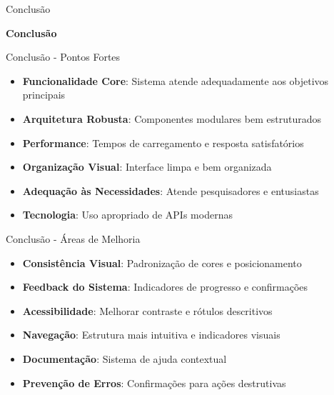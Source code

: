 \documentclass[landscape, 12pt]{beamer}
\begin{document}
\begin{frame}{Conclusão}
    \begin{center}
        \textbf{Conclusão}
    \end{center}
\end{frame}

\begin{frame}{Conclusão - Pontos Fortes}
    \begin{itemize}
        \item \textbf{Funcionalidade Core}: Sistema atende adequadamente aos objetivos principais
        \item \textbf{Arquitetura Robusta}: Componentes modulares bem estruturados
        \item \textbf{Performance}: Tempos de carregamento e resposta satisfatórios
        \item \textbf{Organização Visual}: Interface limpa e bem organizada
        \item \textbf{Adequação às Necessidades}: Atende pesquisadores e entusiastas
        \item \textbf{Tecnologia}: Uso apropriado de APIs modernas
    \end{itemize}
\end{frame}

\begin{frame}{Conclusão - Áreas de Melhoria}
    \begin{itemize}
        \item \textbf{Consistência Visual}: Padronização de cores e posicionamento
        \item \textbf{Feedback do Sistema}: Indicadores de progresso e confirmações
        \item \textbf{Acessibilidade}: Melhorar contraste e rótulos descritivos
        \item \textbf{Navegação}: Estrutura mais intuitiva e indicadores visuais
        \item \textbf{Documentação}: Sistema de ajuda contextual
        \item \textbf{Prevenção de Erros}: Confirmações para ações destrutivas
    \end{itemize}
\end{frame}
\end{document}
